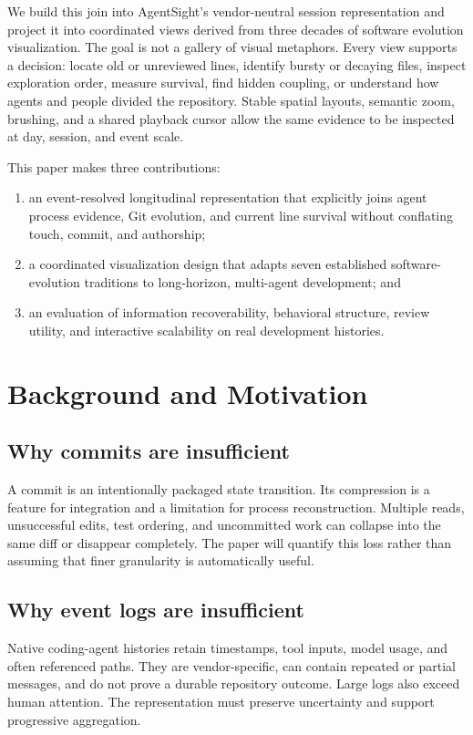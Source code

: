 \documentclass[10pt,twocolumn]{article}
\begin{document}
We build this join into AgentSight's vendor-neutral session representation and
project it into coordinated views derived from three decades of software
evolution visualization. The goal is not a gallery of visual metaphors. Every
view supports a decision: locate old or unreviewed lines, identify bursty or
decaying files, inspect exploration order, measure survival, find hidden
coupling, or understand how agents and people divided the repository. Stable
spatial layouts, semantic zoom, brushing, and a shared playback cursor allow
the same evidence to be inspected at day, session, and event scale.

This paper makes three contributions:
\begin{enumerate}[leftmargin=*]
  \item an event-resolved longitudinal representation that explicitly joins
  agent process evidence, Git evolution, and current line survival without
  conflating touch, commit, and authorship;
  \item a coordinated visualization design that adapts seven established
  software-evolution traditions to long-horizon, multi-agent development; and
  \item an evaluation of information recoverability, behavioral structure,
  review utility, and interactive scalability on real development histories.
\end{enumerate}

\section{Background and Motivation}
\subsection{Why commits are insufficient}
A commit is an intentionally packaged state transition. Its compression is a
feature for integration and a limitation for process reconstruction. Multiple
reads, unsuccessful edits, test ordering, and uncommitted work can collapse
into the same diff or disappear completely. The paper will quantify this loss
rather than assuming that finer granularity is automatically useful.

\subsection{Why event logs are insufficient}
Native coding-agent histories retain timestamps, tool inputs, model usage, and
often referenced paths. They are vendor-specific, can contain repeated or
partial messages, and do not prove a durable repository outcome. Large logs
also exceed human attention. The representation must preserve uncertainty and
support progressive aggregation.
\end{document}
